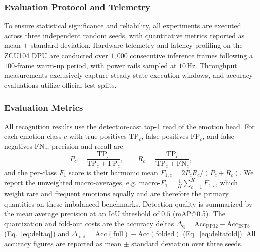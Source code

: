 \documentclass[algorithms,article,submit,moreauthors]{Definitions/mdpi}
\newcommand{\rev}[1]{\textcolor{revcolor}{#1}}
\begin{document}
\subsubsection{Evaluation Protocol and Telemetry}

To ensure statistical significance and reliability, all experiments are executed across three independent random seeds, with quantitative metrics reported as mean $\pm$ standard deviation. Hardware telemetry and latency profiling on the ZCU104 DPU are conducted over $1{,}000$ consecutive inference frames following a $100$-frame warm-up period, with power rails sampled at $10\,$Hz. Throughput measurements exclusively capture steady-state execution windows, and accuracy evaluations utilize official test splits.

\rev{\subsubsection{Evaluation Metrics}\label{sec:metrics}
All recognition results use the detection-cast top-1 read of the emotion head. For each emotion class $c$ with true positives $\mathrm{TP}_c$, false positives $\mathrm{FP}_c$, and false negatives $\mathrm{FN}_c$, precision and recall are
\begin{equation}
P_c = \frac{\mathrm{TP}_c}{\mathrm{TP}_c + \mathrm{FP}_c}, \qquad
R_c = \frac{\mathrm{TP}_c}{\mathrm{TP}_c + \mathrm{FN}_c},
\label{eq:precrec}
\end{equation}
and the per-class $F_1$ score is their harmonic mean $F_{1,c} = 2 P_c R_c / (P_c + R_c)$. We report the unweighted macro-averages, e.g. $\text{macro-}F_1 = \tfrac{1}{K}\sum_{c=1}^{K} F_{1,c}$, which weight rare and frequent emotions equally and are therefore the primary quantities on these imbalanced benchmarks. Detection quality is summarized by the mean average precision at an IoU threshold of $0.5$ (mAP@0.5). The quantization and fold-out costs are the accuracy deltas $\Delta_{\mathrm{q}} = \mathrm{Acc}_{\mathrm{FP32}} - \mathrm{Acc}_{\mathrm{INT8}}$ (Eq.~\eqref{eq:deltaq}) and $\Delta_{\mathrm{fold}} = \mathrm{Acc}(\text{full}) - \mathrm{Acc}(\text{folded})$ (Eq.~\eqref{eq:deltafold}). All accuracy figures are reported as mean $\pm$ standard deviation over three seeds.}

\end{document}
